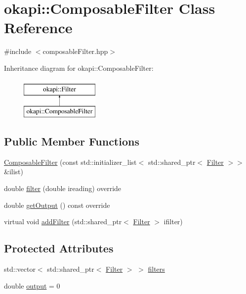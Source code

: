 \hypertarget{classokapi_1_1ComposableFilter}{}\section{okapi\+::Composable\+Filter Class Reference}
\label{classokapi_1_1ComposableFilter}


{\ttfamily \#include $<$composable\+Filter.\+hpp$>$}

Inheritance diagram for okapi\+::Composable\+Filter\+:\begin{figure}[H]
\begin{center}
\leavevmode
\includegraphics[height=2.000000cm]{classokapi_1_1ComposableFilter}
\end{center}
\end{figure}
\subsection*{Public Member Functions}
\begin{DoxyCompactItemize}
\item 
\mbox{\hyperlink{classokapi_1_1ComposableFilter_ab435425858bcf6710a9ffc1fdcd84fa0}{Composable\+Filter}} (const std\+::initializer\+\_\+list$<$ std\+::shared\+\_\+ptr$<$ \mbox{\hyperlink{classokapi_1_1Filter}{Filter}} $>$$>$ \&ilist)
\item 
double \mbox{\hyperlink{classokapi_1_1ComposableFilter_a76925f04dcd186b249e5bfb169f27992}{filter}} (double ireading) override
\item 
double \mbox{\hyperlink{classokapi_1_1ComposableFilter_a2d54899ce84c463af2f22cfbf36c7c7c}{get\+Output}} () const override
\item 
virtual void \mbox{\hyperlink{classokapi_1_1ComposableFilter_a5a051c89bddbccaaaffa83d868f6b289}{add\+Filter}} (std\+::shared\+\_\+ptr$<$ \mbox{\hyperlink{classokapi_1_1Filter}{Filter}} $>$ ifilter)
\end{DoxyCompactItemize}
\subsection*{Protected Attributes}
\begin{DoxyCompactItemize}
\item 
std\+::vector$<$ std\+::shared\+\_\+ptr$<$ \mbox{\hyperlink{classokapi_1_1Filter}{Filter}} $>$ $>$ \mbox{\hyperlink{classokapi_1_1ComposableFilter_a83da1d231c702e8db79557a2b458fc90}{filters}}
\item 
double \mbox{\hyperlink{classokapi_1_1ComposableFilter_ab956536a303c97c86fd2ec3af3c35eef}{output}} = 0
\end{DoxyCompactItemize}


